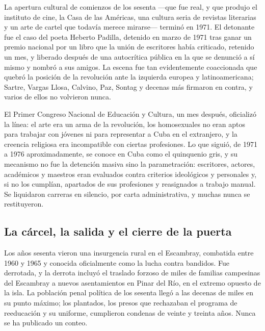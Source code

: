 La apertura cultural de comienzos de los sesenta ---que fue real, y que produjo
el instituto de cine, la Casa de las Américas, una cultura seria de revistas
literarias y un arte de cartel que todavía merece mirarse--- terminó en 1971. El
detonante fue el caso del poeta Heberto Padilla, detenido en marzo de 1971 tras
ganar un premio nacional por un libro que la unión de escritores había criticado,
retenido un mes, y liberado después de una autocrítica pública en la que se
denunció a sí mismo y nombró a sus amigos. La escena fue tan evidentemente
coaccionada que quebró la posición de la revolución ante la izquierda europea y
latinoamericana; Sartre, Vargas Llosa, Calvino, Paz, Sontag y decenas más
firmaron en contra, y varios de ellos no volvieron nunca.

El Primer Congreso Nacional de Educación y Cultura, un mes después, oficializó la
línea: el arte era un arma de la revolución, los homosexuales no eran aptos para
trabajar con jóvenes ni para representar a Cuba en el extranjero, y la creencia
religiosa era incompatible con ciertas profesiones. Lo que siguió, de 1971 a 1976
aproximadamente, se conoce en Cuba como el quinquenio gris, y su mecanismo no fue
la detención masiva sino la parametración: escritores, actores, académicos y
maestros eran evaluados contra criterios ideológicos y personales y, si no los
cumplían, apartados de sus profesiones y reasignados a trabajo manual. Se
liquidaron carreras en silencio, por carta administrativa, y muchas nunca se
restituyeron.

\subsection{La cárcel, la salida y el cierre de la puerta}

Los años sesenta vieron una insurgencia rural en el Escambray, combatida entre
1960 y 1965 y conocida oficialmente como la lucha contra bandidos. Fue derrotada,
y la derrota incluyó el traslado forzoso de miles de familias campesinas del
Escambray a nuevos asentamientos en Pinar del Río, en el extremo opuesto de la
isla. La población penal política de los sesenta llegó a las decenas de miles en
su punto máximo; los plantados, los presos que rechazaban el programa de
reeducación y su uniforme, cumplieron condenas de veinte y treinta años.\unv{}
Nunca se ha publicado un conteo.

